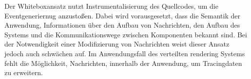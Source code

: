 Der Whiteboxansatz nutzt Instrumentalisierung des Quellcodes, um die Eventgeneriernug anzustoßen. Dabei wird vorausgesetzt, dass die Semantik der Anwendung, Informationen über den Aufbau von Nachrichten, den Aufbau des Systems und die Kommunikationswege zwischen Komponenten bekannt sind. Bei der Notwendigkeit einer Modifizierung von Nachrichten weist dieser Ansatz jedoch auch schwächen auf. Im Anwendungsfall des verteilten rendering Systems fehlt die Möglichkeit, Nachrichten, innerhalb der Anwendung, um Tracingdaten zu erweitern.


